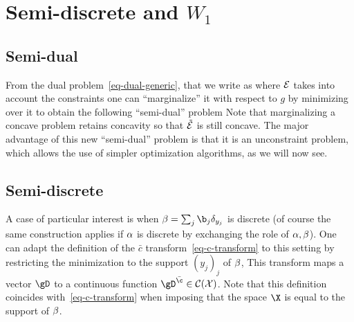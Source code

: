 
\section{Semi-discrete and $W_1$}

\subsection{Semi-dual}

From the dual problem~\eqref{eq-dual-generic}, that we write as 
where $\mathcal{E}$ takes into account the constraints
one can ``marginalize'' it with respect to $g$ by minimizing over it to obtain the following ``semi-dual'' problem
Note that marginalizing a concave problem retains concavity so that $\tilde {\mathcal{E}}$ is still concave. The major advantage of this new ``semi-dual'' problem is that it is an unconstraint problem, which allows the use of simpler optimization algorithms, as we will now see. 



\subsection{Semi-discrete}

A case of particular interest is when $\be = \sum_j \b_j \de_{y_j}$ is discrete (of course the same construction applies if $\alpha$ is discrete by exchanging the role of $\alpha,\beta$).
%
One can adapt the definition of the $\bar c$ transform~\eqref{eq-c-transform} to this setting by restricting the minimization to the support $(y_j)_j$ of $\beta$,
This transform maps a vector $\gD$ to a continuous function $\gD^{\bar \c} \in \Cc(\Xx)$.
%
Note that this definition coincides with~\eqref{eq-c-transform} when imposing that the space $\X$ is equal to the support of $\beta$.

